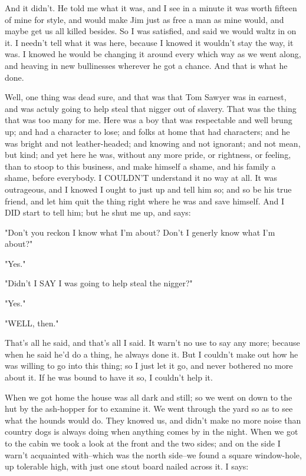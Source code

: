 And it didn't.  He told me what it was, and I see in a minute it was
worth fifteen of mine for style, and would make Jim just as free a man as
mine would, and maybe get us all killed besides.  So I was satisfied, and
said we would waltz in on it.  I needn't tell what it was here, because I
knowed it wouldn't stay the way, it was.  I knowed he would be changing
it around every which way as we went along, and heaving in new
bullinesses wherever he got a chance.  And that is what he done.

Well, one thing was dead sure, and that was that Tom Sawyer was in
earnest, and was actuly going to help steal that nigger out of slavery.
That was the thing that was too many for me.  Here was a boy that was
respectable and well brung up; and had a character to lose; and folks at
home that had characters; and he was bright and not leather-headed; and
knowing and not ignorant; and not mean, but kind; and yet here he was,
without any more pride, or rightness, or feeling, than to stoop to this
business, and make himself a shame, and his family a shame, before
everybody.  I COULDN'T understand it no way at all.  It was outrageous,
and I knowed I ought to just up and tell him so; and so be his true
friend, and let him quit the thing right where he was and save himself.
And I DID start to tell him; but he shut me up, and says:

"Don't you reckon I know what I'm about?  Don't I generly know what I'm
about?"

"Yes."

"Didn't I SAY I was going to help steal the nigger?"

"Yes."

"WELL, then."

That's all he said, and that's all I said.  It warn't no use to say any
more; because when he said he'd do a thing, he always done it.  But I
couldn't make out how he was willing to go into this thing; so I just let
it go, and never bothered no more about it.  If he was bound to have it
so, I couldn't help it.

When we got home the house was all dark and still; so we went on down to
the hut by the ash-hopper for to examine it.  We went through the yard so
as to see what the hounds would do.  They knowed us, and didn't make no
more noise than country dogs is always doing when anything comes by in
the night.  When we got to the cabin we took a look at the front and the
two sides; and on the side I warn't acquainted with--which was the north
side--we found a square window-hole, up tolerable high, with just one
stout board nailed across it.  I says:

